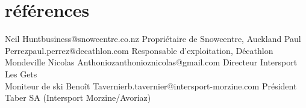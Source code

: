 \documentclass[]{farangoth-cv}
\begin{document}
\section{références}
\begin{entrylist}
  \doubleentryref%
  {Neil Hunt}{business@snowcentre.co.nz}
  {
    Propriétaire de Snowcentre, Auckland 
  }
  {Paul Perrez}{paul.perrez@decathlon.com}
  {
    Responsable d'exploitation, Décathlon Mondeville
  }
  \doubleentryref%
  {Nicolas Anthonioz}{anthonioznicolas@gmail.com}
  {
    Directeur Intersport Les Gets\\
    Moniteur de ski
  }
  {Benoît Tavernier}{b.tavernier@intersport-morzine.com}%
  {
    Président Taber SA (Intersport Morzine/Avoriaz) 
  }
\end{entrylist}
\end{document}

